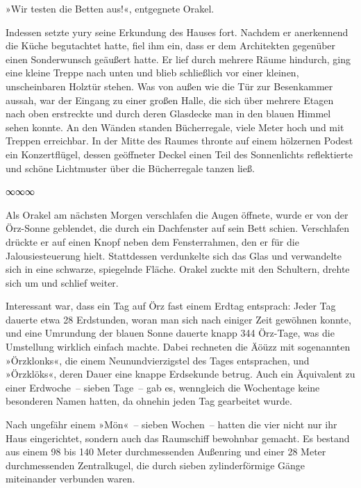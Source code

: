 »Wir testen die Betten aus!«, entgegnete Orakel.

Indessen setzte yury seine Erkundung des Hauses fort. Nachdem er anerkennend die Küche begutachtet hatte, fiel ihm ein, dass er dem Architekten gegenüber einen Sonderwunsch geäußert hatte. Er lief durch mehrere Räume hindurch, ging eine kleine Treppe nach unten und blieb schließlich vor einer kleinen, unscheinbaren Holztür stehen. Was von außen wie die Tür zur Besenkammer aussah, war der Eingang zu einer großen Halle, die sich über mehrere Etagen nach oben erstreckte und durch deren Glasdecke man in den blauen Himmel sehen konnte. An den Wänden standen Bücherregale, viele Meter hoch und mit Treppen erreichbar. In der Mitte des Raumes thronte auf einem hölzernen Podest ein Konzertflügel, dessen geöffneter Deckel einen Teil des Sonnenlichts reflektierte und schöne Lichtmuster über die Bücherregale tanzen ließ.

\begin{center}
    ∞∞∞
\end{center}

Als Orakel am nächsten Morgen verschlafen die Augen öffnete, wurde er von der Örz-Sonne geblendet, die durch ein Dachfenster auf sein Bett schien. Verschlafen drückte er auf einen Knopf neben dem Fensterrahmen, den er für die Jalousiesteuerung hielt. Stattdessen verdunkelte sich das Glas und verwandelte sich in eine schwarze, spiegelnde Fläche. Orakel zuckte mit den Schultern, drehte sich um und schlief weiter.

Interessant war, dass ein Tag auf Örz fast einem Erdtag entsprach: Jeder Tag dauerte etwa 28 Erdstunden, woran man sich nach einiger Zeit gewöhnen konnte, und eine Umrundung der blauen Sonne dauerte knapp 344 Örz-Tage, was die Umstellung wirklich einfach machte. Dabei rechneten die Äöüzz mit sogenannten »Örzklonks«, die einem Neunundvierzigstel des Tages entsprachen, und »Örzklöks«, deren Dauer eine knappe Erdsekunde betrug. Auch ein Äquivalent zu einer Erdwoche~– sieben Tage~– gab es, wenngleich die Wochentage keine besonderen Namen hatten, da ohnehin jeden Tag gearbeitet wurde.

Nach ungefähr einem »Mön«~– sieben Wochen~– hatten die vier nicht nur ihr Haus eingerichtet, sondern auch das Raumschiff bewohnbar gemacht. Es bestand aus einem 98 bis 140 Meter durchmessenden Außenring und einer 28 Meter durchmessenden Zentralkugel, die durch sieben zylinderförmige Gänge miteinander verbunden waren.

